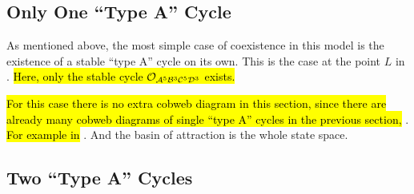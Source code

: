 \subsection{Only One ``Type A'' Cycle}
\label{sec:arch.coex.A}

As mentioned above, the most simple case of coexistence in this model is the existence of a stable ``type A'' cycle on its own.
This is the case at the point $L$ in .
\hl{
	Here, only the stable cycle $\mathcal{O}_{\mathcal{A}^5\mathcal{B}^3\mathcal{C}^5\mathcal{D}^3}$ exists.
}

\hl{For this case there is no extra cobweb diagram in this section, since there are already many cobweb diagrams of single ``type A'' cycles in the previous section,} .
\hl{For example in} .
And the basin of attraction is the whole state space.

\subsection{Two ``Type A'' Cycles}
\label{sec:arch.coex.AA}

